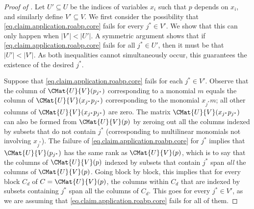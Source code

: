   \begin{proof}[Proof of ]
  Let \(U'\subseteq U\) be the indices of variables \(x_i\) such that \(p\)
  depends on \(x_i\),
  and similarly define \(V'\subseteq V\).
  We first consider the possibility that
  \eqref{eq.claim.application.roabp.core} fails for every
  \(j^* \in V'\).
  We show that this can only happen when \(|V'| < |U'|\).
  A symmetric argument shows that if \eqref{eq.claim.application.roabp.core}
  fails for all \(j^* \in U'\),
  then it must be that \(|U'| < |V'|\).
  As both inequalities cannot simultaneously occur,
  this guarantees the existence of the desired \(j^*\).

  Suppose that \eqref{eq.claim.application.roabp.core} fails
  for each \(j^* \in V'\).
  Observe that the column of \(\CMat{U}{V}(p_{j^*})\) corresponding to a
  monomial $m$ equals the column of \(\CMat{U}{V}(x_{j^*} p_{j^*})\)
  corresponding to the monomial $x_{j^*} m$;
  all other columns of \(\CMat{U}{V}(x_{j^*} p_{j^*})\) are zero.
  The matrix \(\CMat{U}{V}(x_{j^*} p_{j^*})\) can also be formed from
  \(\CMat{U}{V}(p)\) by zeroing out all the columns indexed by subsets that do
  not contain $j^*$
  (corresponding to multilinear monomials not involving \(x_{j^*}\)).
  The failure of \eqref{eq.claim.application.roabp.core} for \(j^*\) implies
  that \(\CMat{U}{V}(p_{j^*})\) has the same rank as \(\CMat{U}{V}(p)\),
  which is to say that the columns of \(\CMat{U}{V}(p)\) indexed by subsets
  that contain $j^*$ span \emph{all} the columns of \(\CMat{U}{V}(p)\).
  Going block by block,
  this implies that for every block \(C_d\) of \(C = \CMat{U}{V}(p)\),
  the columns within \(C_d\) that are indexed by subsets containing $j^*$ span
  all the columns of \(C_d\).
  This goes for every \(j^* \in V'\),
  as we are assuming that \eqref{eq.claim.application.roabp.core} fails for
  all of them.


\end{proof}
